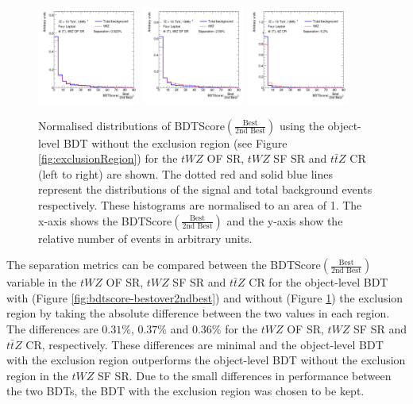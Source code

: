 \begin{figure}[h!]
    \centering
    \includegraphics[width=0.3\textwidth]{figures/bdtPlots/lep4_tWZ_4T_OF_BDT_Score_bestOver2ndBest_sep.png}
    \includegraphics[width=0.3\textwidth]{figures/bdtPlots/lep4_tWZ_4T_SF_BDT_Score_bestOver2ndBest_sep.png}
    \includegraphics[width=0.3\textwidth]{figures/bdtPlots/lep4_ttZ_4T_BDT_Score_bestOver2ndBest_sep.png}
    \caption{Normalised distributions of BDTScore$(\frac{\text{Best}}{\text{2nd Best}})$ using the object-level BDT without the exclusion region (see Figure \ref{fig:exclusionRegion}) for the $tWZ$ OF SR, $tWZ$ SF SR and $t\bar{t}Z$ CR (left to right) are shown. The dotted red and solid blue lines represent the distributions of the signal and total background events respectively. These histograms are normalised to an area of 1. The x-axis shows the BDTScore$(\frac{\text{Best}}{\text{2nd Best}})$ and the y-axis show the relative number of events in arbitrary units.}
    \label{fig:exclusionRegion-normplots}
\end{figure}

The separation metrics can be compared between the BDTScore$(\frac{\text{Best}}{\text{2nd Best}})$ variable in the $tWZ$ OF SR, $tWZ$ SF SR and $t\bar{t}Z$ CR for the object-level BDT with (Figure \ref{fig:bdtscore-bestover2ndbest}) and without (Figure \ref{fig:exclusionRegion-normplots}) the exclusion region by taking the absolute difference between the two values in each region. The differences are $0.31\%$, $0.37\%$ and $0.36\%$ for the $tWZ$ OF SR, $tWZ$ SF SR and $t\bar{t}Z$ CR, respectively. These differences are minimal and the object-level BDT with the exclusion region outperforms the object-level BDT without the exclusion region in the $tWZ$ SF SR. Due to the small differences in performance between the two BDTs, the BDT with the exclusion region was chosen to be kept.



